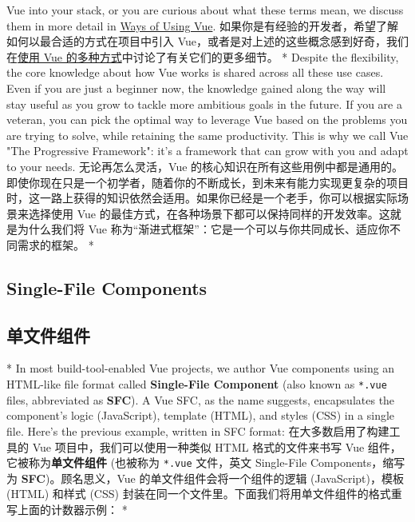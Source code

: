 \begin{paracol}{2}
Vue into your stack, or you are curious about what these terms mean, we
discuss them in more detail in
\href{https://vuejs.org/guide/extras/ways-of-using-vue}{Ways of Using
Vue}.
\switchcolumn
如果你是有经验的开发者，希望了解如何以最合适的方式在项目中引入
Vue，或者是对上述的这些概念感到好奇，我们在\href{https://cn.vuejs.org/guide/extras/ways-of-using-vue.html}{使用
Vue 的多种方式}中讨论了有关它们的更多细节。
\switchcolumn[0]*%
Despite the flexibility, the core knowledge about how Vue works is
shared across all these use cases. Even if you are just a beginner now,
the knowledge gained along the way will stay useful as you grow to
tackle more ambitious goals in the future. If you are a veteran, you can
pick the optimal way to leverage Vue based on the problems you are
trying to solve, while retaining the same productivity. This is why we
call Vue "The Progressive Framework": it's a framework that can grow
with you and adapt to your needs.
\switchcolumn
无论再怎么灵活，Vue
的核心知识在所有这些用例中都是通用的。即使你现在只是一个初学者，随着你的不断成长，到未来有能力实现更复杂的项目时，这一路上获得的知识依然会适用。如果你已经是一个老手，你可以根据实际场景来选择使用
Vue 的最佳方式，在各种场景下都可以保持同样的开发效率。这就是为什么我们将
Vue 称为``渐进式框架''：它是一个可以与你共同成长、适应你不同需求的框架。
\switchcolumn[0]*%
\subsection{Single-File Components}
\switchcolumn
\subsection{单文件组件}
\switchcolumn[0]*%
In most build-tool-enabled Vue projects, we author Vue components using
an HTML-like file format called \textbf{Single-File Component} (also
known as \texttt{*.vue} files, abbreviated as \textbf{SFC}). A Vue SFC,
as the name suggests, encapsulates the component's logic (JavaScript),
template (HTML), and styles (CSS) in a single file. Here's the previous
example, written in SFC format:
\switchcolumn
在大多数启用了构建工具的 Vue 项目中，我们可以使用一种类似 HTML
格式的文件来书写 Vue 组件，它被称为\textbf{单文件组件} (也被称为
\texttt{*.vue} 文件，英文 Single-File Components，缩写为
\textbf{SFC})。顾名思义，Vue 的单文件组件会将一个组件的逻辑
(JavaScript)，模板 (HTML) 和样式 (CSS)
封装在同一个文件里。下面我们将用单文件组件的格式重写上面的计数器示例：
\switchcolumn[0]*%

\switchcolumn


\end{paracol}
